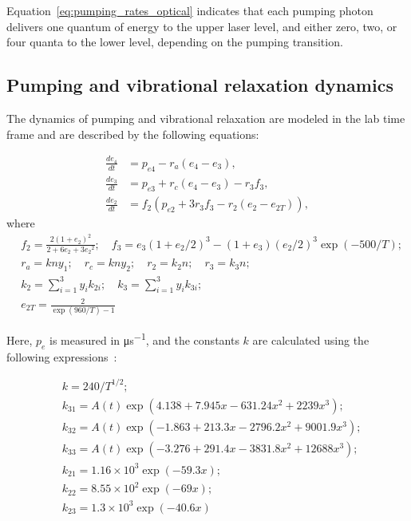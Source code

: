 Equation~\ref{eq:pumping_rates_optical} indicates that each pumping photon delivers one quantum of energy to the upper laser level, and either zero, two, or four quanta to the lower level, depending on the pumping transition.


\subsection{Pumping and vibrational relaxation dynamics}

The dynamics of pumping and vibrational relaxation are modeled in the lab time frame and are described by the following equations:

\begin{equation}\label{eq:dedt}
\begin{aligned}
\frac{d e_4}{dt} &= p_{e4} - r_a (e_4 - e_3), \\
\frac{d e_3}{dt} &= p_{e3} + r_c(e_4 - e_3) - r_3 f_3, \\
\frac{d e_2}{dt} &= f_2 \left( p_{e2} + 3 r_3 f_3 - r_2 (e_2 - e_{2T}) \right),
\end{aligned}
\end{equation}
where
\begin{equation}\label{eq:dedt_rates}
\begin{aligned}
&f_2 = \frac{2(1+e_2)^2}{2+6e_2+3{e_2}^2};\quad f_3 = e_3(1+e_2/2)^3 - (1+e_3)(e_2/2)^3 \exp(- 500/T);\\
&r_a = kny_1;\quad r_c = kny_2;\quad r_2 = k_2n;\quad r_3 = k_3n;\\
&k_2 = \sum\limits_{i=1}^3 y_i k_{2i};\quad k_3 = \sum\limits_{i=1}^3 y_i k_{3i};\\
&e_{2T} = \frac{2}{\exp(960/T)-1}
\end{aligned}
\end{equation}

Here, $p_e$ is measured in \si{\micro\second^{-1}}, and the constants $k$ are calculated using the following expressions~\cite{Biryukov-1974, Taylor-1969}:

\begin{equation}
\begin{aligned}
&k = 240 / T^{1/2};\\
&k_{31} = A(t)\exp(4.138 + 7.945x - 631.24x^2 + 2239x^3);\\
&k_{32} = A(t)\exp(-1.863 + 213.3x - 2796.2x^2 + 9001.9x^3);\\
&k_{33} = A(t)\exp(-3.276 + 291.4x - 3831.8x^2 + 12688x^3);\\
&k_{21} = 1.16 \times 10^3 \exp(-59.3x);\\
&k_{22} = 8.55 \times 10^2 \exp(-69x);\\
&k_{23} = 1.3 \times 10^3 \exp(-40.6x)
\end{aligned}
\end{equation}

